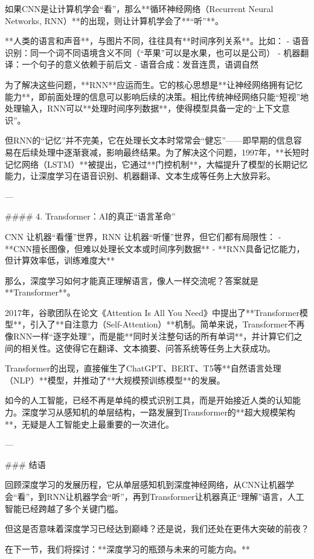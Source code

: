 如果CNN是让计算机学会“看”，那么**循环神经网络（Recurrent Neural Networks, RNN）**的出现，则让计算机学会了**“听”**。

**人类的语言和声音**，与图片不同，往往具有**时间序列关系**。比如：
- 语音识别：同一个词不同语境含义不同（“苹果”可以是水果，也可以是公司）
- 机器翻译：一个句子的意义依赖于前后文
- 语音合成：发音连贯，语调自然

为了解决这些问题，**RNN**应运而生。它的核心思想是**让神经网络拥有记忆能力**，即前面处理的信息可以影响后续的决策。相比传统神经网络只能“短视”地处理输入，RNN可以**处理时间序列数据**，使得模型具备一定的“上下文意识”。

但RNN的“记忆”并不完美，它在处理长文本时常常会“健忘”——即早期的信息容易在后续处理中逐渐衰减，影响最终结果。为了解决这个问题，1997年，**长短时记忆网络（LSTM）**被提出，它通过**门控机制**，大幅提升了模型的长期记忆能力，让深度学习在语音识别、机器翻译、文本生成等任务上大放异彩。

---

#### 4. Transformer：AI的真正“语言革命”

CNN 让机器“看懂”世界，RNN 让机器“听懂”世界，但它们都有局限性：
- **CNN擅长图像，但难以处理长文本或时间序列数据**
- **RNN具备记忆能力，但计算效率低，训练难度大**

那么，深度学习如何才能真正理解语言，像人一样交流呢？答案就是**Transformer**。

2017年，谷歌团队在论文《Attention Is All You Need》中提出了**Transformer模型**，引入了**自注意力（Self-Attention）**机制。简单来说，Transformer不再像RNN一样“逐字处理”，而是能**同时关注整句话的所有单词**，并计算它们之间的相关性。这使得它在翻译、文本摘要、问答系统等任务上大获成功。

Transformer的出现，直接催生了ChatGPT、BERT、T5等**自然语言处理（NLP）**模型，并推动了**大规模预训练模型**的发展。

如今的人工智能，已经不再是单纯的模式识别工具，而是开始接近人类的认知能力。深度学习从感知机的单层结构，一路发展到Transformer的**超大规模架构**，无疑是人工智能史上最重要的一次进化。

---

### 结语

回顾深度学习的发展历程，它从单层感知机到深度神经网络，从CNN让机器学会“看”，到RNN让机器学会“听”，再到Transformer让机器真正“理解”语言，人工智能已经跨越了多个关键门槛。

但这是否意味着深度学习已经达到巅峰？还是说，我们还处在更伟大突破的前夜？

在下一节，我们将探讨：**深度学习的瓶颈与未来的可能方向。**